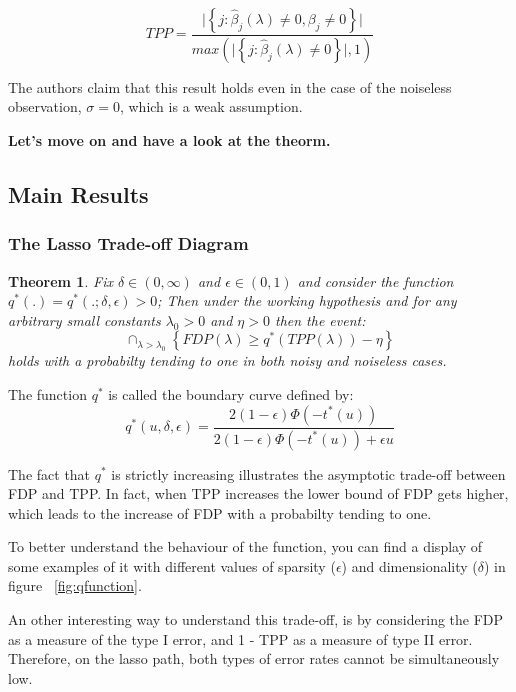 \documentclass[10pt,onecolumn,letterpaper]{article}
\newtheorem{theorem}{Theorem}
\begin{document}
$$
TPP = \frac{\vert \left\{ j: \hat{\beta}_j(\lambda) \neq 0, \beta_j \neq 0 \right\} \vert}{ max \left( \vert \left\{ j: \hat{\beta}_j(\lambda) \neq 0 \right\} \vert, 1 \right) }
$$

The authors claim that this result holds even in the case of the noiseless observation, $\sigma = 0$, which is a weak assumption.
\newline


\textbf{Let's move on and have a look at the theorm.}


\subsection{Main Results}

\subsubsection{The Lasso Trade-off Diagram}


\begin{theorem}
Fix $\delta \in \left (0,\infty \right )$ and $ \epsilon \in \left (0,1 \right) $  and consider the function $ q^*(.) = q^*(.;\delta, \epsilon ) > 0 $; Then under the working hypothesis and for any arbitrary small constants $ \lambda_0 > 0$ and $\eta > 0$ then the event:
$$ \cap_{\lambda > \lambda_0} \left\{FDP(\lambda ) \geq q^* \left( TPP(\lambda)\right) - \eta \right\}
$$
 holds with a probabilty tending to one in both noisy and noiseless cases. 
\end{theorem}


 The function $q^*$ is called the boundary curve defined by:
 $$
q^*\left(u,\delta,\epsilon\right) = \frac{2(1-\epsilon)\Phi(-t^*(u))}{2(1-\epsilon)\Phi(-t^*(u)) + \epsilon u}
 $$

The fact that $q^*$ is strictly increasing illustrates the asymptotic trade-off between FDP and TPP. In fact, when TPP increases the lower bound of FDP gets higher, which leads to the increase of FDP with a probabilty tending to one. 


To better understand the behaviour of the function, you can find a display of some examples of it with different values of sparsity ($\epsilon$) and dimensionality ($\delta$) in figure ~\ref{fig:qfunction}.


An other interesting way to understand this trade-off, is by considering the FDP as a measure of the type I error, and 1 - TPP as a measure of type II error. Therefore, on the lasso path, both types of error rates cannot be simultaneously low. 
\end{document}
